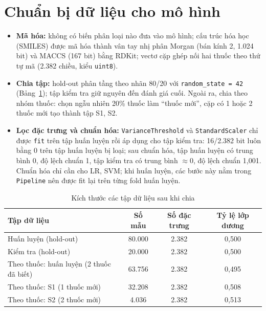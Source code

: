 \documentclass[12pt,a4paper,oneside]{report}
\begin{document}
\section{Chuẩn bị dữ liệu cho mô hình}
\label{sec:chuanbi}
\begin{itemize}
  \item \textbf{Mã hóa:} không có biến phân loại nào đưa vào mô hình; cấu trúc
        hóa học (SMILES) được mã hóa thành vân tay nhị phân Morgan (bán kính 2,
        1.024 bit) và MACCS (167 bit) bằng RDKit; vectơ cặp ghép nối hai thuốc
        theo thứ tự mã (2.382 chiều, kiểu \texttt{uint8}).
  \item \textbf{Chia tập:} hold-out phân tầng theo nhãn 80/20 với
        \texttt{random\_state = 42} (Bảng~\ref{tab:kichthuoc}); tập kiểm tra giữ
        nguyên đến đánh giá cuối. Ngoài ra, chia theo nhóm thuốc: chọn ngẫu nhiên
        20\% thuốc làm ``thuốc mới'', cặp có 1 hoặc 2 thuốc mới tạo thành tập
        S1, S2.
  \item \textbf{Lọc đặc trưng và chuẩn hóa:} \texttt{VarianceThreshold} và
        \texttt{StandardScaler} chỉ được \texttt{fit} trên tập huấn luyện rồi áp
        dụng cho tập kiểm tra: 16/2.382 bit luôn bằng 0 trên tập huấn luyện bị
        loại; sau chuẩn hóa, tập huấn luyện có trung bình 0, độ lệch chuẩn 1, tập
        kiểm tra có trung bình $\approx 0$, độ lệch chuẩn 1,001. Chuẩn hóa chỉ
        cần cho LR, SVM; khi huấn luyện, các bước này nằm trong \texttt{Pipeline}
        nên được fit lại trên từng fold huấn luyện.
\end{itemize}

\begin{table}[H]
  \centering
  \caption{Kích thước các tập dữ liệu sau khi chia}
  \label{tab:kichthuoc}
  \small
  \begin{tabular}{lccc}
    \toprule
    \textbf{Tập dữ liệu} & \textbf{Số mẫu} & \textbf{Số đặc trưng} & \textbf{Tỷ lệ lớp dương} \\
    \midrule
    Huấn luyện (hold-out) & 80.000 & 2.382 & 0,500 \\
    Kiểm tra (hold-out)   & 20.000 & 2.382 & 0,500 \\
    \midrule
    Theo thuốc: huấn luyện (2 thuốc đã biết) & 63.756 & 2.382 & 0,495 \\
    Theo thuốc: S1 (1 thuốc mới) & 32.208 & 2.382 & 0,508 \\
    Theo thuốc: S2 (2 thuốc mới) & 4.036 & 2.382 & 0,513 \\
    \bottomrule
  \end{tabular}
\end{table}
\end{document}
